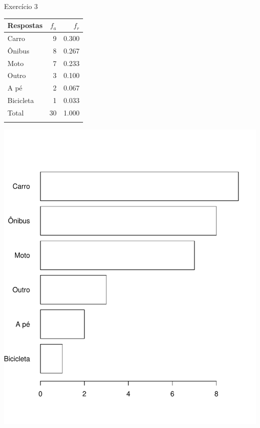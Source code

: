 \documentclass[
  ignorenonframetext,
  serif,
  professionalfont,
  usenames,
  dvipsnames,
  aspectratio = 169]{beamer}
\def\beginAHalfColumn{\begin{minipage}{0.49\textwidth}}%
\def\endColumns{\end{minipage}}%
\begin{document}
\begin{frame}{Exercício 3}
\label{exercuxedcio-3-4}
\beginAHalfColumn

\begin{longtable}[]{@{}lrr@{}}
\toprule\noalign{}
Respostas & \(f_a\) & \(f_r\) \\
\midrule\noalign{}
\endhead
Carro & 9 & 0.300 \\
Ônibus & 8 & 0.267 \\
Moto & 7 & 0.233 \\
Outro & 3 & 0.100 \\
A pé & 2 & 0.067 \\
Bicicleta & 1 & 0.033 \\
Total & 30 & 1.000 \\
\bottomrule\noalign{}
\end{longtable}

\endColumns
\beginAHalfColumn

\begin{center}\includegraphics[width=0.9\linewidth]{exercicios-encontro1-solucao_files/figure-beamer/unnamed-chunk-8-1} \end{center}

\endColumns
\end{frame}
\end{document}
